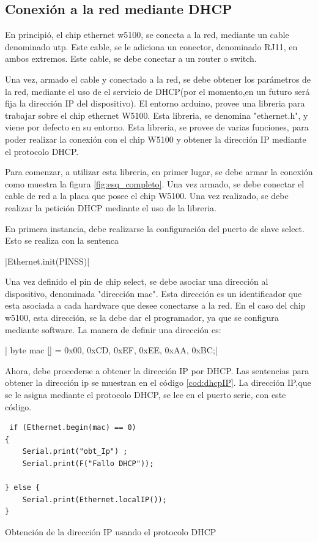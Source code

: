 \subsection{Conexión a la red mediante DHCP} 

En principió, el chip ethernet w5100, se conecta a la red, mediante un cable denominado utp. Este cable, se le adiciona un conector, denominado RJ11, en ambos extremos. Este cable, se debe conectar a un router o switch.   

 Una vez, armado el cable y conectado a la red, se debe obtener los parámetros de la red, mediante el uso de el servicio de DHCP(por el momento,en un futuro será fija la dirección IP del dispositivo). El entorno arduino, provee una libreria para trabajar sobre el chip ethernet W5100. Esta libreria, se denomina "ethernet.h", y viene por defecto en su entorno. Esta libreria, se provee de varias funciones, para poder realizar la conexión con el chip W5100 y obtener la dirección IP mediante el protocolo DHCP. 
 
 Para comenzar, a utilizar esta libreria, en primer lugar, se debe armar la conexión como muestra la figura \ref{fig:esq_completo}. Una vez armado, se debe conectar el cable de red a la placa que posee el chip W5100. Una vez realizado, se debe realizar la petición DHCP mediante el uso de la libreria. 
 
  
En primera instancia, debe realizarse la configuración del puerto de slave select. Esto se realiza con la sentenca 

|Ethernet.init(PINSS)| 

Una vez definido el pin de chip select, se debe asociar una dirección al dispositivo, denominada "dirección mac". Esta dirección es un identificador que esta asociada a cada hardware que desee conectarse a la red. En el caso del chip w5100, esta dirección, se la debe dar el programador, ya que se configura mediante software. La manera de definir una dirección es: 

|  byte mac [] = {0x00, 0xCD, 0xEF, 0xEE, 0xAA, 0xBC};|  

Ahora, debe procederse a obtener la dirección IP por DHCP. Las sentencias para obtener la dirección ip se muestran en el código \ref{cod:dhcpIP}. La dirección IP,que se le asigna mediante el protocolo DHCP, se lee en el puerto serie, con este código.

\begin{listing}[ht]
	\begin{verbatim}
 if (Ethernet.begin(mac) == 0)
{
	Serial.print("obt_Ip") ;
	Serial.print(F("Fallo DHCP"));
	
} else {
	Serial.print(Ethernet.localIP());
}		
	\end{verbatim}
\caption{Obtención de la dirección IP usando el protocolo DHCP} 	
\label{cod:dhcpIP} 
\end{listing}


